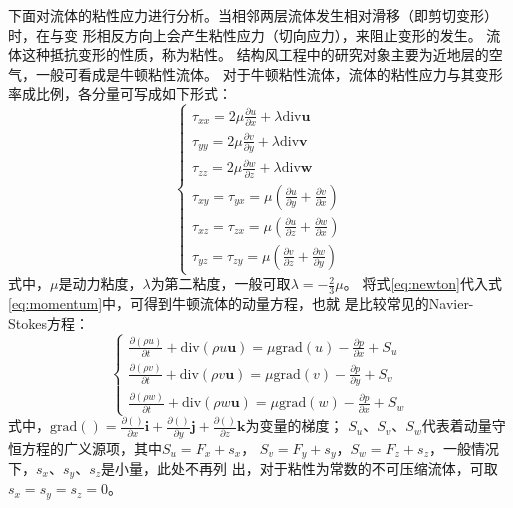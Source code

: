 下面对流体的粘性应力进行分析。当相邻两层流体发生相对滑移（即剪切变形）时，在与变
形相反方向上会产生粘性应力（切向应力），来阻止变形的发生。
流体这种抵抗变形的性质，称为粘性。
结构风工程中的研究对象主要为近地层的空气，一般可看成是牛顿粘性流体。
对于牛顿粘性流体，流体的粘性应力与其变形率成比例，各分量可写成如下形式：
\begin{equation}
  \label{eq:newton}
  \begin{cases}
    \tau_{xx}=2\mu \frac{\partial u}{\partial x} + \lambda \mathrm{div} \bm{u} \\
    \tau_{yy}=2\mu \frac{\partial v}{\partial y} + \lambda \mathrm{div} \bm{v} \\
    \tau_{zz}=2\mu \frac{\partial w}{\partial z} + \lambda \mathrm{div} \bm{w} \\
    \tau_{xy}=\tau_{yx}=\mu \left( \frac{\partial u}{\partial y} +
      \frac{\partial v}{\partial x} \right) \\
    \tau_{xz}=\tau_{zx}=\mu \left( \frac{\partial u}{\partial z} +
      \frac{\partial w}{\partial x} \right) \\
    \tau_{yz}=\tau_{zy}=\mu \left( \frac{\partial v}{\partial z} +
      \frac{\partial w}{\partial y} \right)
  \end{cases}
\end{equation}
式中，$\mu$是动力粘度，$\lambda$为第二粘度，一般可取$\lambda=-\frac{2}{3}\mu$。
将式\eqref{eq:newton}代入式\eqref{eq:momentum}中，可得到牛顿流体的动量方程，也就
是比较常见的Navier-Stokes方程：
\begin{equation}
  \label{eq:ns}
  \begin{cases}
    \frac{\partial (\rho u)}{\partial t} + \mathrm{div}(\rho u \bm{u}) =
    \mu  \bm{\mathrm{grad} }(u) - \frac{\partial p}{\partial x} + S_u \\
    \frac{\partial (\rho v)}{\partial t} + \mathrm{div}(\rho v \bm{u}) =
    \mu \bm{\mathrm{ grad} }(v) - \frac{\partial p}{\partial y} + S_v \\
    \frac{\partial (\rho w)}{\partial t} + \mathrm{div}(\rho w \bm{u}) =
    \mu \bm{\mathrm{ grad} }(w) - \frac{\partial p}{\partial x} + S_w
  \end{cases}
\end{equation}
式中，$\bm{\mathrm{grad}}() = \frac{\partial ()}{\partial x} \bm{i} + \frac{\partial
  ()}{\partial y} \bm{j} + \frac{\partial ()}{\partial z} \bm{k}$为变量的梯度；
$S_u$、$S_v$、$S_w$代表着动量守恒方程的广义源项，其中$S_u=F_x+s_x$，
$S_v=F_y+s_y$，$S_w=F_z+s_z$，一般情况下，$s_x$、$s_y$、$s_z$是小量，此处不再列
出，对于粘性为常数的不可压缩流体，可取$s_x=s_y=s_z=0$。

